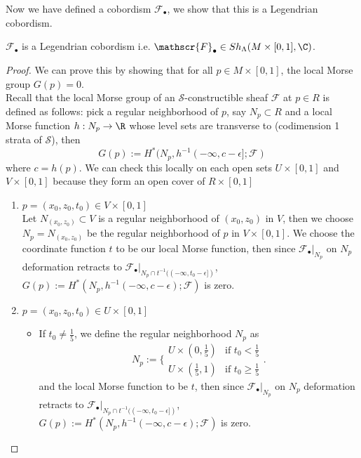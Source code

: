 Now we have defined a cobordism $\mathscr{F}_\bullet$, we show that this is a Legendrian cobordism.
\begin{proposition}
$\mathscr{F}_\bullet$ is a Legendrian cobordism i.e. $\mathscr{F}_\bullet \in Sh_\Lambda(M \times [0,1],\C)$.
\end{proposition}
\begin{proof}
We can prove this by showing that for all $p\in M\times [0,1]$, the local Morse group $G(p)=0$.\\
Recall that the local Morse group of an $\mathcal{S}$-constructible sheaf $\mathscr{F}$ at $p\in R$ is defined as follows: pick a regular neighborhood of $p$, say $N_p \subset R$ and a local Morse function $h: N_p \rightarrow \R$ whose level sets are transverse to (codimension 1 strata of $\mathcal{S}$), then
\[
G(p):= H^{*}(N_p,h^{-1}(-\infty,c-\epsilon];\mathscr{F})
\]
where $c=h(p)$. We can check this locally on each open sets $U\times[0,1]$ and $V\times[0,1]$ because they form an open cover of $R\times [0,1]$
\begin{enumerate}[label=(Case \arabic*)~]
\item $p = (x_0,z_0,t_0) \in V\times[0,1]$\\
Let $N_{(x_0,z_0)}\subset V$ is a regular neighborhood of $(x_0,z_0)$ in $V$, then we choose $N_p = N_{(x_0,z_0)}$ be the regular neighborhood of $p$ in $V\times [0,1]$. We choose the coordinate function $t$ to be our local Morse function, then since $\mathscr{F}_\bullet |_{N_p}$ on $N_p$ deformation retracts to $\mathscr{F}_\bullet |_{N_p \cap t^{-1}((-\infty, t_0 -\epsilon])}$, $G(p):= H^{*}(N_p,h^{-1}(-\infty,c-\epsilon);\mathscr{F})$ is zero. 

\item  $p = (x_0,z_0,t_0) \in U\times[0,1]$\\
\begin{itemize}
\item If $t_0 \neq \frac{1}{5}$, we define the regular neighborhood $N_p$ as 
\[N_p:=\bigg\{
\begin{array}{ll}
    U\times (0,\frac{1}{5}) & \text{if } t_0 < \frac{1}{5} \\
    U\times (\frac{1}{5},1) & \text{if } t_0 \geq \frac{1}{5} 
\end{array}
\bigg.
\]
and the local Morse function to be $t$, then since $\mathscr{F}_\bullet |_{N_p}$ on $N_p$ deformation retracts to $\mathscr{F}_\bullet |_{N_p \cap t^{-1}((-\infty, t_0 -\epsilon])}$, $G(p):= H^{*}(N_p,h^{-1}(-\infty,c-\epsilon);\mathscr{F})$ is zero. 


\end{itemize}
\end{enumerate}
\end{proof}

